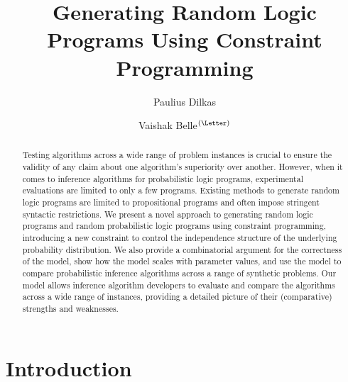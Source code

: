 \documentclass[runningheads]{llncs}
\begin{document}
\title{Generating Random Logic Programs Using Constraint Programming}
\author{Paulius Dilkas \and Vaishak Belle$^{(\textrm{\Letter})}$}

\maketitle

\begin{abstract}
  Testing algorithms across a wide range of problem instances is crucial to
  ensure the validity of any claim about one algorithm's superiority over
  another. However, when it comes to inference algorithms for probabilistic
  logic programs, experimental evaluations are limited to only a few programs.
  Existing methods to generate random logic programs are limited to
  propositional programs and often impose stringent syntactic restrictions. We
  present a novel approach to generating random logic programs and random
  probabilistic logic programs using constraint programming, introducing a new
  constraint to control the independence structure of the underlying probability
  distribution. We also provide a combinatorial argument for the correctness of
  the model, show how the model scales with parameter values, and use the model
  to compare probabilistic inference algorithms across a range of synthetic
  problems. Our model allows inference algorithm developers to evaluate and
  compare the algorithms across a wide range of instances, providing a detailed
  picture of their (comparative) strengths and weaknesses.

\end{abstract}

\section{Introduction}
\end{document}
